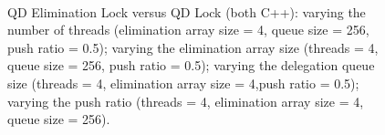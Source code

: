 \begin{figure}[]
\centering
{}
\\
\caption[]{QD Elimination Lock versus QD Lock (both C++):  varying the number of threads (elimination array size = 4, queue size = 256, push ratio = 0.5);  varying the elimination array size (threads = 4, queue size = 256, push ratio = 0.5);  varying the delegation queue size (threads = 4, elimination array size = 4,push ratio = 0.5);  varying the push ratio (threads = 4, elimination array size = 4, queue size = 256).}
\label{fig:final}
\end{figure}

